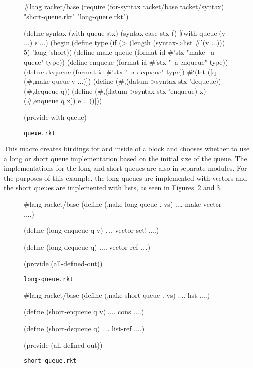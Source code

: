 \documentclass[preprint]{sigplanconf}
\begin{document}
\begin{figure}[h]
\begin{schemedisplay}
#lang racket/base
(require (for-syntax racket/base
                     racket/syntax)
         "short-queue.rkt"
         "long-queue.rkt")

(define-syntax (with-queue stx)
  (syntax-case stx ()
    [(with-queue (v ...) e ...)
     (begin
       (define type 
         (if (> (length (syntax->list #'(v ...))) 5) 
	     'long 
             'short))
       (define make-queue 
         (format-id #'stx "make-~a-queue" type))
       (define enqueue (format-id #'stx "~a-enqueue" type))
       (define dequeue (format-id #'stx "~a-dequeue" type))
       #`(let ([q (#,make-queue v ...)])
           (define (#,(datum->syntax stx 'dequeue)) 
             (#,dequeue q))
           (define (#,(datum->syntax stx 'enqueue) x)
             (#,enqueue q x))
           e ...))]))

(provide with-queue)
\end{schemedisplay}
\caption{\texttt{queue.rkt}}
\label{queue-rkt}
\end{figure}

This macro creates bindings for  and  inside of a  block and chooses whether to use a long or short queue implementation based on the initial size of the queue.
The implementations for the long and short queues are also in separate modules. 
For the purposes of this example, the long queues are implemented with vectors and the short queues are implemented with lists, as seen in Figures~\ref{long-queue-rkt} and \ref{short-queue-rkt}.

\begin{figure}[h]
\begin{schemedisplay}
#lang racket/base
(define (make-long-queue . vs)
  .... make-vector ....)

(define (long-enqueue q v)
  .... vector-set! ....)

(define (long-dequeue q)
  .... vector-ref ....)

(provide (all-defined-out))
\end{schemedisplay}
\caption{\texttt{long-queue.rkt}}
\label{long-queue-rkt}
\end{figure}

\begin{figure}[h]
\begin{schemedisplay}
#lang racket/base
(define (make-short-queue . vs)
  .... list ....)

(define (short-enqueue q v)
  .... cons ....)

(define (short-dequeue q)
  .... list-ref ....)

(provide (all-defined-out))
\end{schemedisplay}
\caption{\texttt{short-queue.rkt}}
\label{short-queue-rkt}
\end{figure}
\end{document}
